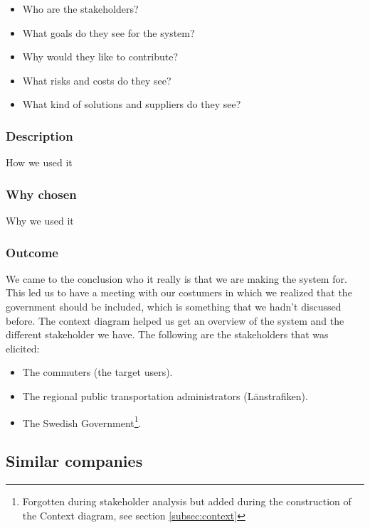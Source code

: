 \documentclass[a4paper]{article}
\begin{document}
    \begin{itemize}
      \item Who are the stakeholders?
      \item What goals do they see for the system?
      \item Why would they like to contribute?
      \item What risks and costs do they see?
      \item What kind of solutions and suppliers do they see?
    \end{itemize}
    
    \subsubsection{Description}
    How we used it
    \subsubsection{Why chosen}
    Why we used it
    \subsubsection{Outcome}
    We came to the conclusion who it really is that we are making the system for. This led us to have a meeting with our costumers in which we realized that the government should be included, which is something that we hadn't discussed before.
    The context diagram helped us get an overview of the system and the different stakeholder we have.
    The following are the stakeholders that was elicited:
    \begin{itemize}
      \item The commuters (the target users). 
      \item The regional public transportation administrators (Länstrafiken). 
      \item The Swedish Government\footnote{Forgotten during stakeholder analysis but added during the construction of the Context diagram, see section \ref{subsec:context}}.
    \end{itemize}
    
    
    \subsection{Similar companies}
\end{document}
